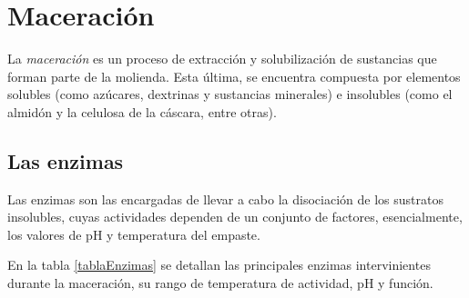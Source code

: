    \section{Maceración}
        \par La \textit{maceración} es un proceso de extracción y solubilización de sustancias que forman parte de la molienda. Esta última, se encuentra compuesta por elementos solubles (como azúcares, dextrinas y sustancias minerales) e insolubles (como el almidón y la celulosa de la cáscara, entre otras).
        
        \subsection{Las enzimas}
            \par Las enzimas son las encargadas de llevar a cabo la disociación de los sustratos insolubles, cuyas actividades dependen de un conjunto de factores, esencialmente, los valores de pH y temperatura del empaste. 
            \par En la tabla \ref{tablaEnzimas} se detallan las principales enzimas intervinientes durante la maceración, su rango de temperatura de actividad, pH y función.
